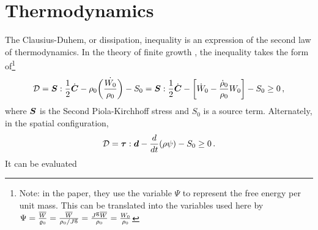\documentclass[10pt,letterpaper,oneside]{report}
\newcommand{\ten}[1]{\mbox{\boldmath $#1$}{}}
\newcommand{\scas}[1]{\mbox{{\scriptsize{${\rm{#1}}$}}}{}}
\begin{document}
\section{Thermodynamics}
The Clausius-Duhem, or dissipation, inequality is an expression of the second law of thermodynamics.  In the theory of finite growth \autocite{KuhlSteinmann2003}, the inequality takes the form of\footnote{Note: in the paper, they use the variable $\Psi$ to represent the free energy per unit mass.  This can be translated into the variables used here by $\Psi = \frac{\overline{W}}{\varrho_0} = \frac{\overline{W}}{\rho_0/J^{\scas{g}}} = \frac{J^{\scas{g}} \overline{W}}{\rho_0} = \frac{W_0}{\rho_0}$}
\begin{equation}
\mathcal{D} 
= \ten{S} : \frac{1}{2} \dot{\ten{C}} - \rho_0 \dot{\left( \frac{W_0}{\rho_0} \right) } - S_0 
= \ten{S} : \frac{1}{2} \dot{\ten{C}} - \left[ \dot{W}_0 - \frac{\dot{\rho}_0}{\rho_0} W_0  \right] - S_0 
\geq 0 \, , 
\end{equation}
where $\ten{S}$ is the Second Piola-Kirchhoff stress and $S_0$ is a source term. 
Alternately, in the spatial configuration, 
\begin{equation}
\mathcal{D} = \ten{\tau} : \ten{d} - \frac{d}{dt} (\rho \psi ) - S_0 \geq 0 \, .
\end{equation}
It can be evaluated 
\end{document}
